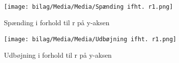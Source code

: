 \begin{figure}
    \centering
    \texttt{[image: bilag/Media/Media/Spænding ifht. r1.png]}
    \caption{Spænding i forhold til r på y-aksen}
    \label{fig: Spænding ifht. r1}
\end{figure}

\begin{figure}
    \centering
    \texttt{[image: bilag/Media/Media/Udbøjning ifht. r1.png]}
    \caption{Udbøjning i forhold til r på y-aksen}
    \label{fig: Udbøjning ifht. r1}
\end{figure}

